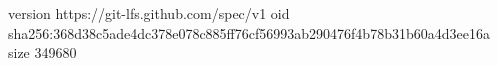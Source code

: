 version https://git-lfs.github.com/spec/v1
oid sha256:368d38c5ade4dc378e078c885ff76cf56993ab290476f4b78b31b60a4d3ee16a
size 349680
